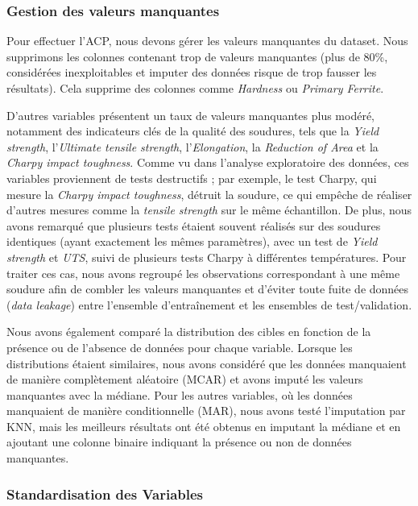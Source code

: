 \documentclass{article}
\begin{document}
\subsubsection{Gestion des valeurs manquantes}

Pour effectuer l'ACP, nous devons gérer les valeurs manquantes du dataset.
Nous supprimons les colonnes contenant trop de valeurs manquantes (plus de 80\%, considérées inexploitables et imputer des données risque de trop fausser les résultats). Cela supprime des colonnes comme \textit{Hardness} ou \textit{Primary Ferrite}.

D'autres variables présentent un taux de valeurs manquantes plus modéré, notamment des indicateurs clés de la qualité des soudures, tels que la \textit{Yield strength}, l'\textit{Ultimate tensile strength}, l'\textit{Elongation}, la \textit{Reduction of Area} et la \textit{Charpy impact toughness}. Comme vu dans l'analyse exploratoire des données, ces variables proviennent de tests destructifs ; par exemple, le test Charpy, qui mesure la \textit{Charpy impact toughness}, détruit la soudure, ce qui empêche de réaliser d'autres mesures comme la \textit{tensile strength} sur le même échantillon. De plus, nous avons remarqué que plusieurs tests étaient souvent réalisés sur des soudures identiques (ayant exactement les mêmes paramètres), avec un test de \textit{Yield strength} et \textit{UTS}, suivi de plusieurs tests Charpy à différentes températures. Pour traiter ces cas, nous avons regroupé les observations correspondant à une même soudure afin de combler les valeurs manquantes et d'éviter toute fuite de données (\textit{data leakage}) entre l'ensemble d'entraînement et les ensembles de test/validation.

Nous avons également comparé la distribution des cibles en fonction de la présence ou de l'absence de données pour chaque variable. Lorsque les distributions étaient similaires, nous avons considéré que les données manquaient de manière complètement aléatoire (MCAR) et avons imputé les valeurs manquantes avec la médiane. Pour les autres variables, où les données manquaient de manière conditionnelle (MAR), nous avons testé l'imputation par KNN, mais les meilleurs résultats ont été obtenus en imputant la médiane et en ajoutant une colonne binaire indiquant la présence ou non de données manquantes.

\subsubsection{Standardisation des Variables}
\end{document}
